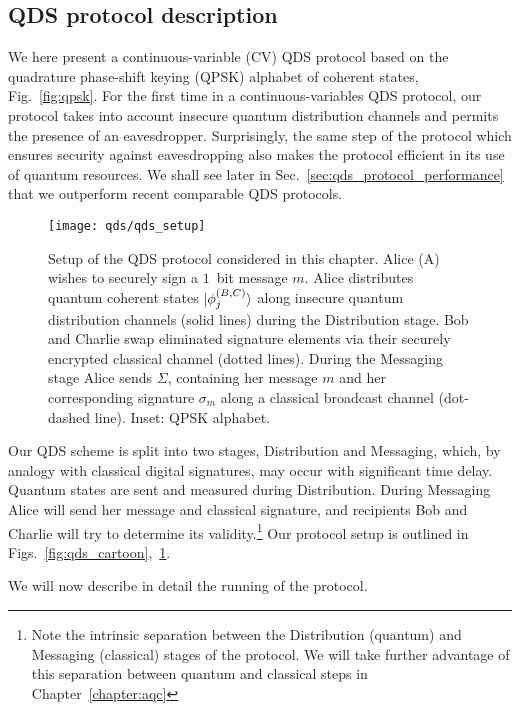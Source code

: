 \subsection{QDS protocol description}

We here present a continuous-variable (CV) QDS protocol based on the quadrature phase-shift keying (QPSK) alphabet of coherent states, Fig.~\ref{fig:qpsk}. For the first time in a continuous-variables QDS protocol, our protocol takes into account insecure quantum distribution channels and permits the presence of an eavesdropper. Surprisingly, the same step of the protocol which ensures security against eavesdropping also makes the protocol efficient in its use of quantum resources. We shall see later in Sec.~\ref{sec:qds_protocol_performance} that we outperform recent comparable QDS protocols.

\begin{figure}[htp]
\captionsetup{width=0.8\linewidth}
\centering
\texttt{[image: qds/qds\_setup]}
\caption{\label{fig:qds_setup} Setup of the QDS protocol considered in this chapter. Alice (A) wishes to securely sign a $1$~bit message $m$. Alice distributes quantum coherent states $\ket{\phi_j^{\left(B, C\right)}}$ along insecure quantum distribution channels (solid lines) during the Distribution stage. Bob and Charlie swap eliminated signature elements via their securely encrypted classical channel (dotted lines). During the Messaging stage Alice sends $\Sigma$, containing her message $m$ and her corresponding signature $\sigma_m$ along a classical broadcast channel (dot-dashed line). Inset: QPSK alphabet.}
\end{figure}


Our QDS scheme is split into two stages, Distribution and Messaging, which, by analogy with classical digital signatures, may occur with significant time delay. Quantum states are sent and measured during Distribution. During Messaging Alice will send her message and classical signature, and recipients Bob and Charlie will try to determine its validity.\footnote{Note the intrinsic separation between the Distribution (quantum) and Messaging (classical) stages of the protocol. We will take further advantage of this separation between quantum and classical steps in Chapter~\ref{chapter:aqc}} Our protocol setup is outlined in Figs.~\ref{fig:qds_cartoon},~\ref{fig:qds_setup}. 
\par
\noindent We will now describe in detail the running of the protocol.



